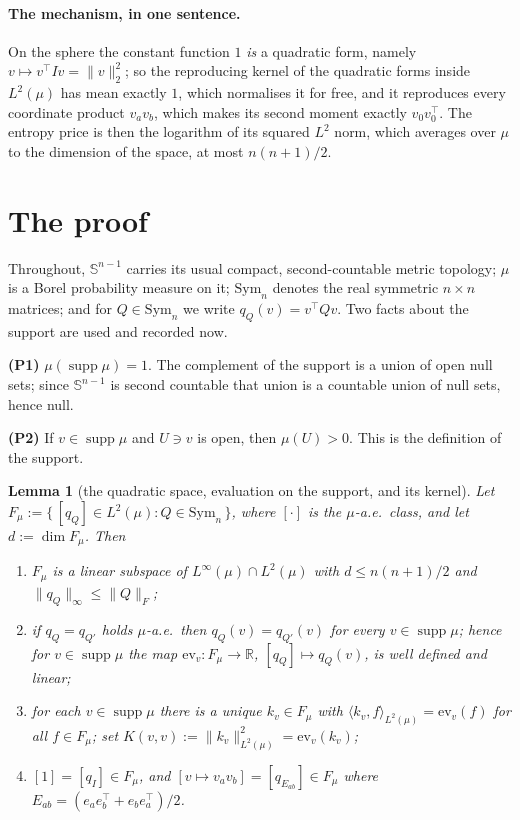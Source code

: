 \documentclass[11pt]{article}
\newtheorem{lemma}[theorem]{Lemma}
\theoremstyle{remark}
\newcommand{\Sph}{\mathbb{S}^{n-1}}
\newcommand{\R}{\mathbb{R}}
\newcommand{\Sym}{\mathrm{Sym}_n}
\newcommand{\Fm}{F_\mu}
\newcommand{\supp}{\operatorname{supp}}
\newcommand{\ev}{\mathrm{ev}}
\begin{document}
\paragraph{The mechanism, in one sentence.} On the sphere the constant function $1$ \emph{is}
a quadratic form, namely $v\mapsto v^{\top}Iv=\|v\|_2^2$; so the reproducing kernel of the
quadratic forms inside $L^2(\mu)$ has mean exactly $1$, which normalises it for free, and it
reproduces every coordinate product $v_av_b$, which makes its second moment exactly
$v_0v_0^{\top}$. The entropy price is then the logarithm of its squared $L^2$ norm, which
averages over $\mu$ to the dimension of the space, at most $n(n+1)/2$.

\section{The proof}

Throughout, $\Sph$ carries its usual compact, second-countable metric topology; $\mu$ is a
Borel probability measure on it; $\Sym$ denotes the real symmetric $n\times n$ matrices; and
for $Q\in\Sym$ we write $q_Q(v) = v^{\top}Qv$. Two facts about the support are used and
recorded now.

\smallskip
\noindent\textbf{(P1)} $\mu(\supp\mu)=1$. The complement of the support is a union of open
null sets; since $\Sph$ is second countable that union is a countable union of null sets,
hence null.

\noindent\textbf{(P2)} If $v\in\supp\mu$ and $U\ni v$ is open, then $\mu(U)>0$. This is the
definition of the support.

\begin{lemma}[the quadratic space, evaluation on the support, and its kernel]\label{lem:1}
Let $\Fm := \{\,[q_Q]\in L^2(\mu) : Q\in\Sym\,\}$, where $[\cdot]$ is the $\mu$-a.e.\ class,
and let $d := \dim\Fm$. Then
\begin{enumerate}
\item[(a)] $\Fm$ is a linear subspace of $L^{\infty}(\mu)\cap L^2(\mu)$ with $d\leq n(n+1)/2$
and $\|q_Q\|_{\infty}\leq\|Q\|_F$;
\item[(b)] if $q_Q = q_{Q'}$ holds $\mu$-a.e.\ then $q_Q(v)=q_{Q'}(v)$ for \emph{every}
$v\in\supp\mu$; hence for $v\in\supp\mu$ the map $\ev_v:\Fm\to\R$, $[q_Q]\mapsto q_Q(v)$, is
well defined and linear;
\item[(c)] for each $v\in\supp\mu$ there is a unique $k_v\in\Fm$ with
$\langle k_v,f\rangle_{L^2(\mu)} = \ev_v(f)$ for all $f\in\Fm$; set
$K(v,v) := \|k_v\|^2_{L^2(\mu)} = \ev_v(k_v)$;
\item[(d)] $[1]=[q_I]\in\Fm$, and $[v\mapsto v_av_b]=[q_{E_{ab}}]\in\Fm$ where
$E_{ab}=(e_ae_b^{\top}+e_be_a^{\top})/2$.
\end{enumerate}
\end{lemma}
\end{document}
